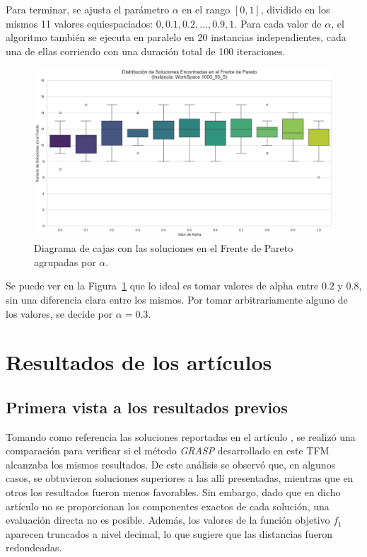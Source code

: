 \documentclass[12pt,a4paper]{book}
\begin{document}
Para terminar, se ajusta el parámetro $\alpha$ en el rango $[0,1]$, dividido en los mismos 11 valores equiespaciados: $0, 0.1, 0.2, \dots, 0.9, 1$.  
Para cada valor de $\alpha$, el algoritmo también se ejecuta en paralelo en 20 instancias independientes, cada una de ellas corriendo con una duración total de 100 iteraciones.


\begin{figure}[htbp!]
    \centering
    \includegraphics[width=0.8\linewidth]{images_finetuning/alpha_20_100}
    \caption{Diagrama de cajas con las soluciones en el Frente de Pareto agrupadas por $\alpha$.}
    \label{fig:alpha}
\end{figure}

Se puede ver en la Figura~\ref{fig:alpha} que lo ideal es tomar valores de alpha entre $0.2$ y $0.8$, sin una diferencia clara entre los mismos. Por tomar arbitrariamente alguno de los valores, se decide por $\alpha=0.3$.

\section{Resultados de los artículos}

\subsection{Primera vista a los resultados previos}
\label{sec:articulo2}
Tomando como referencia las soluciones reportadas en el artículo \cite{k-Balanced_2}, se realizó una comparación para verificar si el método \textit{GRASP} desarrollado en este TFM alcanzaba los mismos resultados. De este análisis se observó que, en algunos casos, se obtuvieron soluciones superiores a las allí presentadas, mientras que en otros los resultados fueron menos favorables.
Sin embargo, dado que en dicho artículo no se proporcionan los componentes exactos de cada solución, una evaluación directa no es posible. 
Además, los valores de la función objetivo $f_1$ aparecen truncados a nivel decimal, lo que sugiere que las distancias fueron redondeadas.
\end{document}
